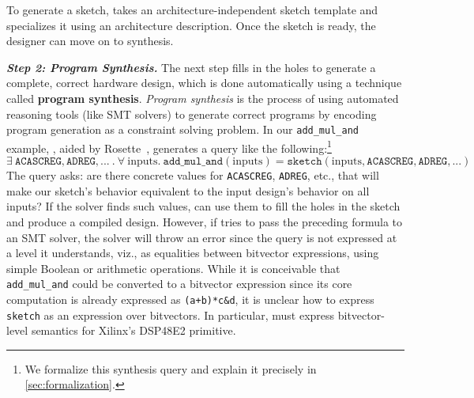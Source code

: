 To generate a sketch,
  \lr takes an architecture-independent
  sketch template
  and specializes it using an
  architecture description.
Once the sketch is ready,
  the designer can move on to synthesis.

\textit{\textbf{Step 2: Program Synthesis.}}
  The next step 
  fills
  in the holes to generate
  a complete, correct
  hardware design,
  which is done automatically
  using a technique called
  \textbf{program synthesis}.
\textit{Program synthesis} is the process of
  using automated reasoning tools
  (like SMT solvers) 
  to generate correct programs
  by encoding program generation
  as a constraint solving problem.
In our \texttt{add\_mul\_and} example,
  \lr, aided  by
  Rosette~\cite{torlak2013growing,torlak2014lightweight}, 
  generates a query like the following:\footnote{
  We formalize this synthesis query and explain it precisely in \cref{sec:formalization}.
}
\footnotesize
$$\exists \ \mathtt{ACASCREG}, \mathtt{ADREG}, ...\ .\ \forall \ \mathrm{inputs} . \ 
  \texttt{add\_mul\_and}(\mathrm{inputs}) 
  = \texttt{sketch}(\mathrm{inputs}, \mathtt{ACASCREG}, \mathtt{ADREG}, ...)
$$
\normalsize
The query asks:
  are there concrete values for
  \texttt{ACASCREG}, \texttt{ADREG}, etc.,
  that will make our sketch's behavior
  equivalent to the input design's behavior
  on all inputs?
If the solver finds such values,
\lr can use them to fill the holes
  in the sketch
  and produce a compiled design.
However, if \lr tries to pass the preceding formula
  to an SMT solver,
  the solver will throw an error since
  the query is not expressed
  at a level 
 it understands, viz., %
  as equalities
  between bitvector expressions,
  using simple Boolean or arithmetic
  operations.
While it is conceivable that \texttt{add\_mul\_and}
  could be converted to
  a bitvector expression
  since its core computation is already
  expressed as
  \texttt{(a+b)*c\&d},
it is unclear how to express
  \texttt{sketch}
  as an expression over bitvectors.
In particular, \lr must express
  bitvector-level semantics
  for Xilinx's DSP48E2 primitive.

